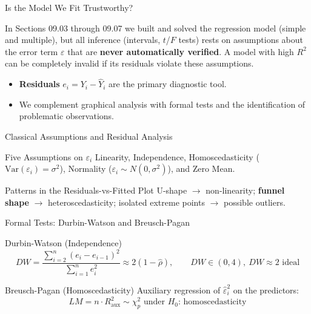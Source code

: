 \documentclass[10pt, aspectratio=169]{beamer}
\begin{document}
\begin{frame}{Is the Model We Fit Trustworthy?}
  \footnotesize
  \begin{motivacion}
    In Sections 09.03 through 09.07 we built and solved the regression model (simple and multiple), but all inference (intervals, $t$/$F$ tests) rests on assumptions about the error term $\varepsilon$ that are \textbf{never automatically verified}. A model with high $R^2$ can be completely invalid if its residuals violate these assumptions.
  \end{motivacion}

  \vspace{0.15cm}
  \pause
  \begin{itemize}\itemsep=0.1cm
    \item \textbf{Residuals} $e_i=Y_i-\hat Y_i$ are the primary diagnostic tool. \pause
    \item We complement graphical analysis with formal tests and the identification of problematic observations.
  \end{itemize}
\end{frame}

\begin{frame}{Classical Assumptions and Residual Analysis}
  \footnotesize
  \begin{block}{Five Assumptions on $\varepsilon_i$}
    Linearity, Independence, Homoscedasticity ($\text{Var}(\varepsilon_i)=\sigma^2$), Normality ($\varepsilon_i\sim N(0,\sigma^2)$), and Zero Mean.
  \end{block}
  \pause

  \vspace{0.1cm}
  \begin{alertblock}{Patterns in the Residuals-vs-Fitted Plot}
    U-shape $\to$ non-linearity; \textbf{funnel shape} $\to$ heteroscedasticity; isolated extreme points $\to$ possible outliers.
  \end{alertblock}
\end{frame}

\begin{frame}{Formal Tests: Durbin-Watson and Breusch-Pagan}
  \footnotesize
  \begin{block}{Durbin-Watson (Independence)}
    $$DW=\frac{\sum_{i=2}^n(e_i-e_{i-1})^2}{\sum_{i=1}^n e_i^2}\approx2(1-\hat\rho), \qquad DW\in(0,4),\ DW\approx2 \text{ ideal}$$
  \end{block}
  \pause

  \vspace{0.1cm}
  \begin{alertblock}{Breusch-Pagan (Homoscedasticity)}
    Auxiliary regression of $\hat\varepsilon_i^2$ on the predictors: $$LM=n\cdot R_{\text{aux}}^2 \sim \chi^2_p \text{ under } H_0\text{: homoscedasticity}$$
  \end{alertblock}
\end{frame}
\end{document}
